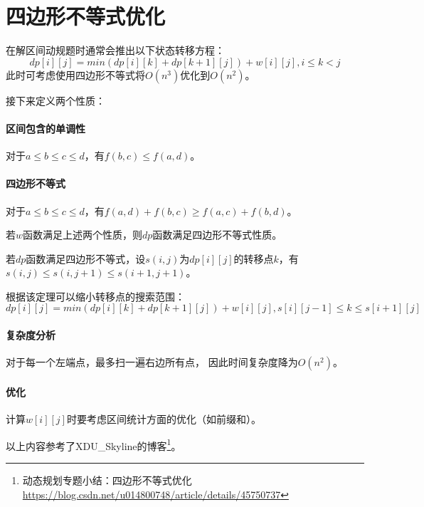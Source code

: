 \section{四边形不等式优化}
在解区间动规题时通常会推出以下状态转移方程：
\begin{displaymath}
    dp[i][j]=min(dp[i][k]+dp[k+1][j])+w[i][j],i\leq k <j
\end{displaymath}
此时可考虑使用四边形不等式将$O(n^3)$优化到$O(n^2)$。

接下来定义两个性质：
\paragraph{区间包含的单调性}
对于$a\leq b\leq c\leq d$，有$f(b,c)\leq f(a,d)$。
\paragraph{四边形不等式}
对于$a\leq b\leq c\leq d$，有$f(a,d)+f(b,c)\geq f(a,c)+f(b,d)$。

\begin{theorem}
    若$w$函数满足上述两个性质，则$dp$函数满足四边形不等式性质。
\end{theorem}

\begin{theorem}
    若$dp$函数满足四边形不等式，设$s(i,j)$为$dp[i][j]$的转移点$k$，有
    $s(i,j)\leq s(i,j+1)\leq s(i+1,j+1)$。
\end{theorem}

根据该定理可以缩小转移点的搜索范围：
\begin{displaymath}
    dp[i][j]=min(dp[i][k]+dp[k+1][j])+w[i][j],s[i][j-1]\leq k \leq s[i+1][j]
\end{displaymath}

\paragraph{复杂度分析} 对于每一个左端点，最多扫一遍右边所有点，
因此时间复杂度降为$O(n^2)$。

\paragraph{优化} 计算$w[i][j]$时要考虑区间统计方面的优化（如前缀和）。

以上内容参考了XDU\_Skyline的博客\footnote{动态规划专题小结：四边形不等式优化
    \url{https://blog.csdn.net/u014800748/article/details/45750737}
}。
